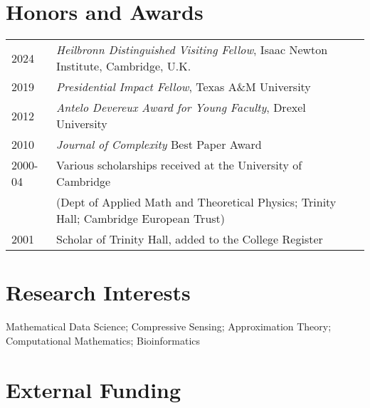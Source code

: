 \documentclass[11pt]{article}
\begin{document}
\section{Honors and Awards}

\begin{tabular}{ll}
2024 & %
{\sl Heilbronn Distinguished Visiting Fellow}, Isaac Newton Institute, Cambridge, U.K.\\
2019 & %
{\sl Presidential Impact Fellow}, Texas A\&M University\\
2012 & %
{\sl Antelo Devereux Award for Young Faculty}, Drexel University\\
2010 & {\sl Journal of Complexity} Best Paper Award\\
2000-04 & Various scholarships received at the University of Cambridge\\
& (Dept  of Applied Math and Theoretical Physics; Trinity Hall; Cambridge European Trust)\\
2001 & Scholar of Trinity Hall, %
added to the College Register
\end{tabular}

\section{Research Interests}

Mathematical Data Science;
Compressive Sensing;
Approximation Theory; 
Computational Mathematics;
Bioinformatics 


 
\section{External Funding}
\end{document}
